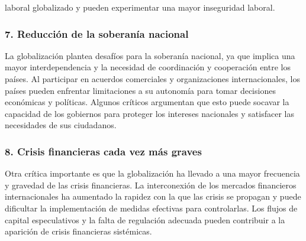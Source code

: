 \documentclass[
  a4paper,
]{article}
\begin{document}
laboral globalizado y pueden experimentar una mayor inseguridad laboral.

\hypertarget{reducciuxf3n-de-la-soberanuxeda-nacional}{%
\subsubsection{7. Reducción de la soberanía
nacional}\label{reducciuxf3n-de-la-soberanuxeda-nacional}}

La globalización plantea desafíos para la soberanía nacional, ya que
implica una mayor interdependencia y la necesidad de coordinación y
cooperación entre los países. Al participar en acuerdos comerciales y
organizaciones internacionales, los países pueden enfrentar limitaciones
a su autonomía para tomar decisiones económicas y políticas. Algunos
críticos argumentan que esto puede socavar la capacidad de los gobiernos
para proteger los intereses nacionales y satisfacer las necesidades de
sus ciudadanos.

\hypertarget{crisis-financieras-cada-vez-muxe1s-graves}{%
\subsubsection{8. Crisis financieras cada vez más
graves}\label{crisis-financieras-cada-vez-muxe1s-graves}}

Otra crítica importante es que la globalización ha llevado a una mayor
frecuencia y gravedad de las crisis financieras. La interconexión de los
mercados financieros internacionales ha aumentado la rapidez con la que
las crisis se propagan y puede dificultar la implementación de medidas
efectivas para controlarlas. Los flujos de capital especulativos y la
falta de regulación adecuada pueden contribuir a la aparición de crisis
financieras sistémicas.


\printbibliography
\end{document}
